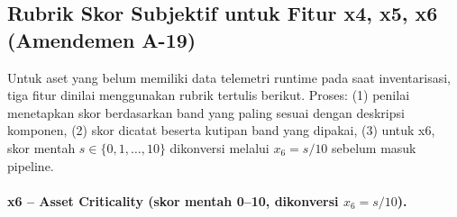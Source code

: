 %
%

\subsection{Rubrik Skor Subjektif untuk Fitur x4, x5, x6 (Amendemen A-19)}
\label{subsec:a19-rubric}

Untuk aset yang belum memiliki data telemetri runtime pada saat
inventarisasi, tiga fitur dinilai menggunakan rubrik tertulis berikut.
Proses: (1) penilai menetapkan skor berdasarkan band yang paling
sesuai dengan deskripsi komponen, (2) skor dicatat beserta kutipan
band yang dipakai, (3) untuk x6, skor mentah $s \in \{0, 1, \ldots, 10\}$
dikonversi melalui $x_6 = s / 10$ sebelum masuk pipeline.

\paragraph{x6 -- Asset Criticality (skor mentah 0--10, dikonversi $x_6 = s/10$).}

